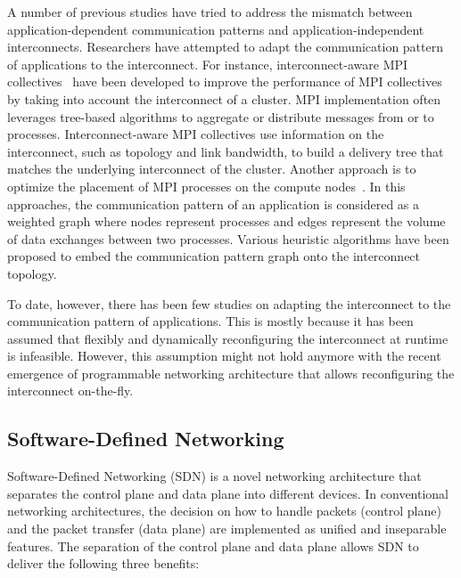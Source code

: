 A  number of previous studies have tried to address the mismatch between
application-dependent communication patterns and application-independent
interconnects. Researchers have attempted to adapt the communication
pattern of applications to the interconnect. For instance, interconnect-aware
MPI collectives~\autocite{Kumar2016,Kumar2014,Gong2015,Adachi2013} have been
developed to improve the performance of MPI collectives by taking into account
the interconnect of a cluster. MPI implementation often leverages tree-based
algorithms to aggregate or distribute messages from or to processes.
Interconnect-aware MPI collectives use information on the interconnect, such
as topology and link bandwidth, to build a delivery tree that matches the
underlying interconnect of the cluster. Another approach is to optimize the
placement of MPI processes on the compute
nodes~\autocite{Michelogiannakis2017,Hoefler2011,Choi2017}. In this
approaches, the communication pattern of an application is considered as a
weighted graph where nodes represent processes and edges represent the volume
of data exchanges between two processes. Various heuristic algorithms have
been proposed to embed the communication pattern graph onto the interconnect
topology.

To date, however, there has been few studies on adapting the
interconnect to the communication pattern of applications. This is mostly
because it has been assumed that flexibly and dynamically reconfiguring the
interconnect at runtime is infeasible. However, this assumption might not hold
anymore with the recent emergence of programmable networking architecture that
allows reconfiguring the interconnect on-the-fly.

\subsection{Software-Defined Networking}\label{sec:i-sdn}

Software-Defined Networking (SDN) is a novel networking architecture
that separates the control plane and data plane into different devices.
In conventional networking architectures, the decision on how to handle
packets (control plane) and the packet transfer (data plane) are
implemented as unified and inseparable features. The separation of the
control plane and data plane allows SDN to deliver the following three
benefits:

